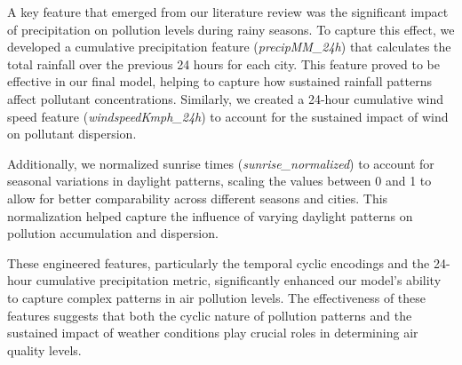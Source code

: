\documentclass[twoside,11pt]{article}
\begin{document}
A key feature that emerged from our literature review was the significant impact of precipitation on pollution levels during rainy seasons. To capture this effect, we developed a cumulative precipitation feature (\textit{precipMM\_24h}) that calculates the total rainfall over the previous 24 hours for each city. This feature proved to be effective in our final model, helping to capture how sustained rainfall patterns affect pollutant concentrations. Similarly, we created a 24-hour cumulative wind speed feature (\textit{windspeedKmph\_24h}) to account for the sustained impact of wind on pollutant dispersion.

Additionally, we normalized sunrise times (\textit{sunrise\_normalized}) to account for seasonal variations in daylight patterns, scaling the values between 0 and 1 to allow for better comparability across different seasons and cities. This normalization helped capture the influence of varying daylight patterns on pollution accumulation and dispersion.

These engineered features, particularly the temporal cyclic encodings and the 24-hour cumulative precipitation metric, significantly enhanced our model's ability to capture complex patterns in air pollution levels. The effectiveness of these features suggests that both the cyclic nature of pollution patterns and the sustained impact of weather conditions play crucial roles in determining air quality levels.


\newpage











\end{document}

